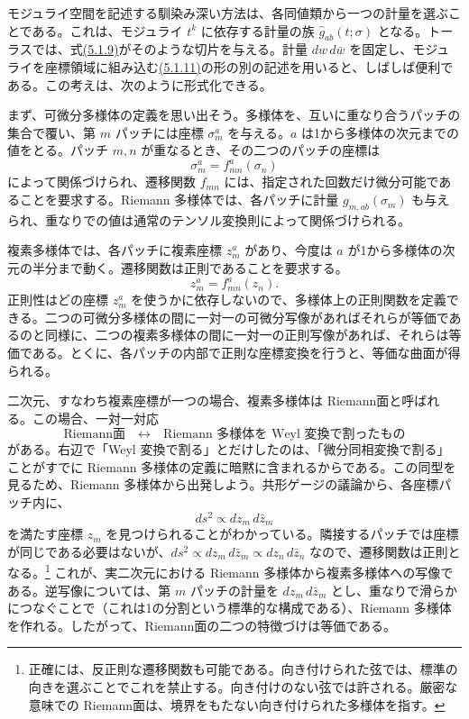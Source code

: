 
モジュライ空間を記述する馴染み深い方法は、各同値類から一つの計量を選ぶことである。これは、モジュライ $t^k$ に依存する計量の族 $\hat g_{ab}(t;\sigma)$ となる。トーラスでは、式\hyperref[eq:5.1.9]{(5.1.9)}がそのような切片を与える。計量 $dw\,d\bar w$ を固定し、モジュライを座標領域に組み込む\hyperref[eq:5.1.11]{(5.1.11)}の形の別の記述を用いると、しばしば便利である。この考えは、次のように形式化できる。

まず、可微分多様体の定義を思い出そう。多様体を、互いに重なり合うパッチの集合で覆い、第 $m$ パッチには座標 $\sigma_m^a$ を与える。$a$ は1から多様体の次元までの値をとる。パッチ $m,n$ が重なるとき、その二つのパッチの座標は
\begin{equation}
\sigma_m^a=f_{mn}^a(\sigma_n)
\tag{5.2.12}\label{eq:5.2.12}
\end{equation}
によって関係づけられ、遷移関数 $f_{mn}$ には、指定された回数だけ微分可能であることを要求する。Riemann 多様体では、各パッチに計量 $g_{m,ab}(\sigma_m)$ も与えられ、重なりでの値は通常のテンソル変換則によって関係づけられる。

複素多様体では、各パッチに複素座標 $z_m^a$ があり、今度は $a$ が1から多様体の次元の半分まで動く。遷移関数は正則であることを要求する。
\begin{equation}
z_m^a=f_{mn}^a(z_n).
\tag{5.2.13}\label{eq:5.2.13}
\end{equation}
正則性はどの座標 $z_m^a$ を使うかに依存しないので、多様体上の正則関数を定義できる。二つの可微分多様体の間に一対一の可微分写像があればそれらが等価であるのと同様に、二つの複素多様体の間に一対一の正則写像があれば、それらは等価である。とくに、各パッチの内部で正則な座標変換を行うと、等価な曲面が得られる。

二次元、すなわち複素座標が一つの場合、複素多様体は Riemann面と呼ばれる。この場合、一対一対応
\begin{equation}
\text{Riemann面}\quad\longleftrightarrow\quad
\text{Riemann 多様体を Weyl 変換で割ったもの}
\tag{5.2.14}\label{eq:5.2.14}
\end{equation}
がある。右辺で「Weyl 変換で割る」とだけしたのは、「微分同相変換で割る」ことがすでに Riemann 多様体の定義に暗黙に含まれるからである。この同型を見るため、Riemann 多様体から出発しよう。共形ゲージの議論から、各座標パッチ内に、
\begin{equation}
ds^2\propto dz_m\,d\bar z_m
\tag{5.2.15}\label{eq:5.2.15}
\end{equation}
を満たす座標 $z_m$ を見つけられることがわかっている。隣接するパッチでは座標が同じである必要はないが、$ds^2\propto dz_m\,d\bar z_m\propto dz_n\,d\bar z_n$ なので、遷移関数は正則となる。\footnote[1]{正確には、反正則な遷移関数も可能である。向き付けられた弦では、標準の向きを選ぶことでこれを禁止する。向き付けのない弦では許される。厳密な意味での Riemann面は、境界をもたない向き付けられた多様体を指す。}
これが、実二次元における Riemann 多様体から複素多様体への写像である。逆写像については、第 $m$ パッチの計量を $dz_m\,d\bar z_m$ とし、重なりで滑らかにつなぐことで（これは1の分割という標準的な構成である）、Riemann 多様体を作れる。したがって、Riemann面の二つの特徴づけは等価である。


